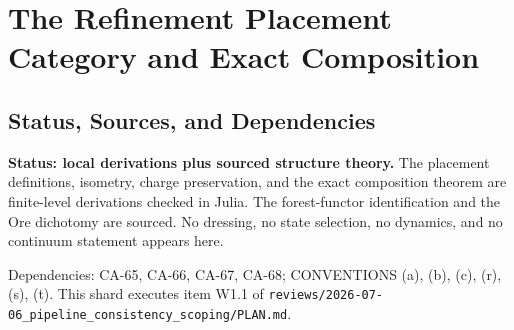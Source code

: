 
\section{The Refinement Placement Category and Exact Composition}
\label{sec:refinement-placement-category}

\subsection{Status, Sources, and Dependencies}

\textbf{Status: local derivations plus sourced structure theory.}  The
placement definitions, isometry, charge preservation, and the exact
composition theorem are finite-level derivations checked in Julia.  The
forest-functor identification and the Ore dichotomy are sourced.  No dressing,
no state selection, no dynamics, and no continuum statement appears here.

Dependencies: CA-65, CA-66, CA-67, CA-68; CONVENTIONS (a), (b), (c), (r),
(s), (t).  This shard executes item W1.1 of
\texttt{reviews/2026-07-06\_pipeline\_consistency\_scoping/PLAN.md}.

